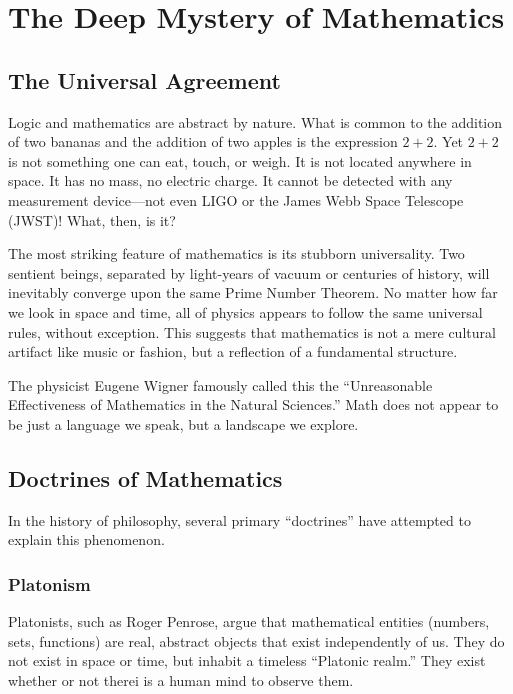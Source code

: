 \chapter{The Deep Mystery of Mathematics}
\label{chap:doctrines-of-math}

\section{The Universal Agreement}

Logic and mathematics are abstract by nature.
What is common to the addition of two bananas and the addition of two apples is the expression $2+2$.
Yet $2+2$ is not something one can eat, touch, or weigh. It is not located anywhere in space.
It has no mass, no electric charge.
It cannot be detected with any measurement device---not even LIGO or the James Webb Space Telescope (JWST)! What, then, is it?

The most striking feature of mathematics is its stubborn universality.
Two sentient beings, separated by light-years of vacuum or centuries of history, will inevitably converge upon the same Prime Number Theorem.
No matter how far we look in space and time, all of physics appears to follow the same universal rules, without exception.
This suggests that mathematics is not a mere cultural artifact like music or fashion, but a reflection of a fundamental structure.

The physicist Eugene Wigner famously called this the ``Unreasonable Effectiveness of Mathematics in the Natural Sciences.''
Math does not appear to be just a language we speak, but a landscape we explore.

\section{Doctrines of Mathematics}

In the history of philosophy, several primary ``doctrines'' have attempted to explain this phenomenon.

\subsection*{Platonism}

Platonists, such as Roger Penrose, argue that mathematical entities (numbers, sets, functions) are real, abstract objects that exist independently of us.
They do not exist in space or time, but inhabit a timeless ``Platonic realm.'' They exist whether or not therei is a human mind to observe them.

